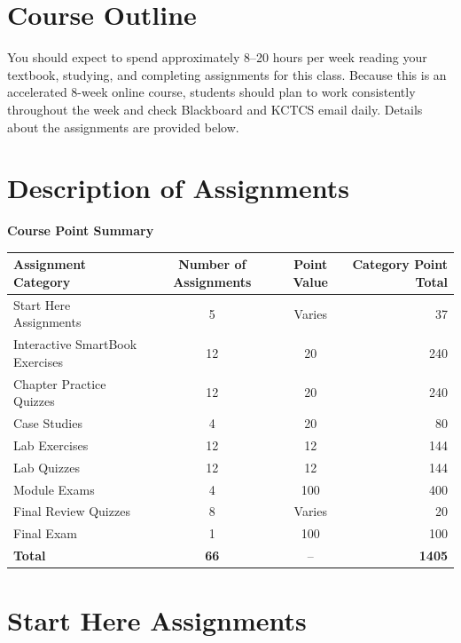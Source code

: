 \section*{Course Outline}

You should expect to spend approximately 8--20 hours per week reading your textbook, studying, and completing assignments for this class. Because this is an accelerated 8-week online course, students should plan to work consistently throughout the week and check Blackboard and KCTCS email daily. Details about the assignments are provided below.

\section*{Description of Assignments}

\begin{tcolorbox}[
  enhanced,
  colback=blue!2,
  colframe=DeepBlue,
  boxrule=0.8pt,
  arc=3pt,
  left=10pt,
  right=10pt,
  top=8pt,
  bottom=8pt
]
{\bfseries\color{DeepBlue} Course Point Summary}

\vspace{0.4em}

\renewcommand{\arraystretch}{1.22}
\begin{tabularx}{\linewidth}{@{}X c c r@{}}
\textbf{Assignment Category} &
\textbf{Number of Assignments} &
\textbf{Point Value} &
\textbf{Category Point Total} \\
\hline
Start Here Assignments & 5 & Varies & 37 \\
Interactive SmartBook Exercises & 12 & 20 & 240 \\
Chapter Practice Quizzes & 12 & 20 & 240 \\
Case Studies & 4 & 20 & 80 \\
Lab Exercises & 12 & 12 & 144 \\
Lab Quizzes & 12 & 12 & 144 \\
Module Exams & 4 & 100 & 400 \\
Final Review Quizzes & 8 & Varies & 20 \\
Final Exam & 1 & 100 & 100 \\
\hline
\textbf{Total} & \textbf{66} & -- & \textbf{1405} \\
\end{tabularx}
\end{tcolorbox}

\section{Start Here Assignments}

